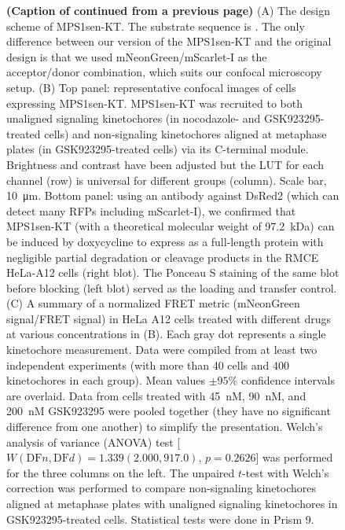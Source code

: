 \begin{figure}
    \noindent\justifying \textbf{(Caption of  continued from a previous page)} (A) The design scheme of MPS1sen-KT. The  substrate sequence is .
    The only difference between our version of the MPS1sen-KT and the original design \cite{MPS1senor} is that we used mNeonGreen/mScarlet-I as the acceptor/donor combination, which suits our confocal microscopy setup. (B) Top panel: representative confocal images of cells expressing MPS1sen-KT. MPS1sen-KT was recruited to both unaligned signaling kinetochores (in nocodazole- and GSK923295-treated cells) and non-signaling kinetochores aligned at metaphase plates (in GSK923295-treated cells) via its C-terminal  module. Brightness and contrast have been adjusted but the LUT for each channel (row) is universal for different groups (column). Scale bar, \SI{10}{\micro m}. Bottom panel: using an antibody against DsRed2 (which can detect many RFPs including mScarlet-I), we confirmed that MPS1sen-KT (with a theoretical molecular weight of \SI{97.2}{kDa}) can be induced by doxycycline to express as a full-length protein with negligible partial degradation or cleavage products in the RMCE HeLa-A12 cells (right blot). The Ponceau S staining of the same blot before blocking (left blot) served as the loading and transfer control. (C) A summary of a normalized FRET metric (mNeonGreen signal/FRET signal) in HeLa A12 cells treated with different drugs at various concentrations in (B). Each gray dot represents a single kinetochore measurement. Data were compiled from at least two independent experiments (with more than 40 cells and 400 kinetochores in each group). Mean values $\pm 95\%$ confidence intervals are overlaid. Data from cells treated with \SI{45}{nM}, \SI{90}{nM}, and \SI{200}{nM} GSK923295 were pooled together (they have no significant difference from one another) to simplify the presentation. Welch's analysis of variance (ANOVA) test [$W(\text{DF}n, \text{DF}d) = 1.339 (2.000, 917.0)$, $p = 0.2626$] was performed for the three columns on the left. The unpaired $t$-test with Welch's correction was performed to compare non-signaling kinetochores aligned at metaphase plates with unaligned signaling kinetochores in GSK923295-treated cells. Statistical tests were done in Prism 9.
\end{figure}

